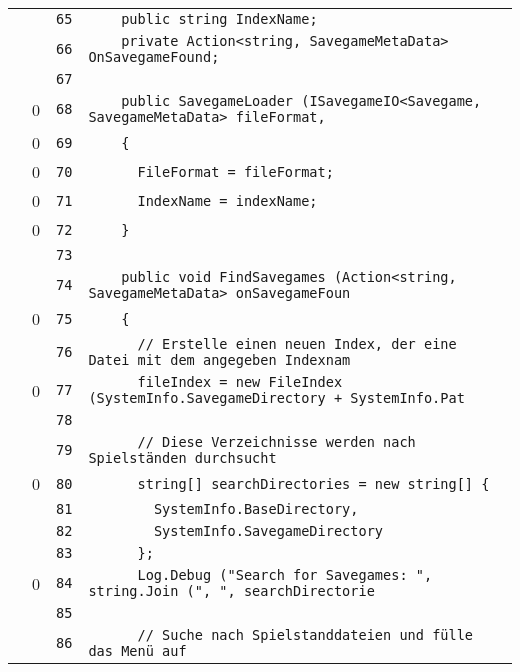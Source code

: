 \documentclass[a4paper,10pt]{article}
\begin{document}
\begin{longtable}[l]{lrrl}
\cellcolor{gray} &  & \verb~65~ & \verb~    public string IndexName;~\\
\cellcolor{gray} &  & \verb~66~ & \verb~    private Action<string, SavegameMetaData> OnSavegameFound;~\\
\cellcolor{gray} &  & \verb~67~ & \verb~~\\
\cellcolor{red} & 0 & \verb~68~ & \verb~    public SavegameLoader (ISavegameIO<Savegame, SavegameMetaData> fileFormat,~\\
\cellcolor{red} & 0 & \verb~69~ & \verb~    {~\\
\cellcolor{red} & 0 & \verb~70~ & \verb~      FileFormat = fileFormat;~\\
\cellcolor{red} & 0 & \verb~71~ & \verb~      IndexName = indexName;~\\
\cellcolor{red} & 0 & \verb~72~ & \verb~    }~\\
\cellcolor{gray} &  & \verb~73~ & \verb~~\\
\cellcolor{gray} &  & \verb~74~ & \verb~    public void FindSavegames (Action<string, SavegameMetaData> onSavegameFoun~\\
\cellcolor{red} & 0 & \verb~75~ & \verb~    {~\\
\cellcolor{gray} &  & \verb~76~ & \verb~      // Erstelle einen neuen Index, der eine Datei mit dem angegeben Indexnam~\\
\cellcolor{red} & 0 & \verb~77~ & \verb~      fileIndex = new FileIndex (SystemInfo.SavegameDirectory + SystemInfo.Pat~\\
\cellcolor{gray} &  & \verb~78~ & \verb~~\\
\cellcolor{gray} &  & \verb~79~ & \verb~      // Diese Verzeichnisse werden nach Spielständen durchsucht~\\
\cellcolor{red} & 0 & \verb~80~ & \verb~      string[] searchDirectories = new string[] {~\\
\cellcolor{gray} &  & \verb~81~ & \verb~        SystemInfo.BaseDirectory,~\\
\cellcolor{gray} &  & \verb~82~ & \verb~        SystemInfo.SavegameDirectory~\\
\cellcolor{gray} &  & \verb~83~ & \verb~      };~\\
\cellcolor{red} & 0 & \verb~84~ & \verb~      Log.Debug ("Search for Savegames: ", string.Join (", ", searchDirectorie~\\
\cellcolor{gray} &  & \verb~85~ & \verb~~\\
\cellcolor{gray} &  & \verb~86~ & \verb~      // Suche nach Spielstanddateien und fülle das Menü auf~\\

\end{longtable}
\end{document}
